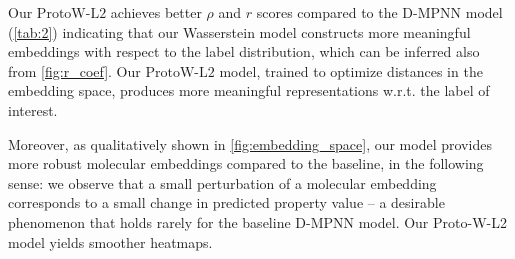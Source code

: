 \documentclass[letterpaper]{article} \usepackage{aaai22}  \usepackage{times}  \usepackage{helvet}  \usepackage{courier}  \usepackage[hyphens]{url}  \usepackage{graphicx} \urlstyle{rm} \def\UrlFont{\rm}  \usepackage{natbib}  \usepackage{caption} \DeclareCaptionStyle{ruled}{labelfont=normalfont,labelsep=colon,strut=off} \frenchspacing  \setlength{\pdfpagewidth}{8.5in}  \setlength{\pdfpageheight}{11in}  \usepackage{algorithm}
\begin{document}
Our $\mathrm{ProtoW\text{-}L2}$ achieves better $\rho$ and $r$ scores compared to the D-MPNN model (\cref{tab:2}) indicating that our Wasserstein model constructs more meaningful embeddings with respect to the label distribution, which can be inferred also from \cref{fig:r_coef}. Our $\mathrm{ProtoW\text{-}L2}$ model, trained to optimize distances in the embedding space, produces more meaningful representations w.r.t. the label of interest.


Moreover, as qualitatively shown in \cref{fig:embedding_space}, our model provides more robust molecular embeddings compared to the baseline, in the following sense: we observe that a small perturbation of a molecular embedding corresponds to a small change in predicted property value -- a desirable phenomenon that holds rarely for the baseline D-MPNN model. Our Proto-W-L2 model yields smoother heatmaps.
\end{document}
